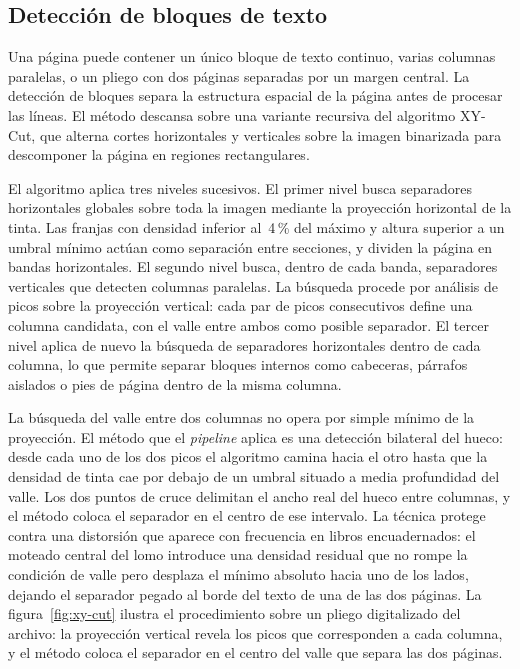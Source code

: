 \subsection{Detección de bloques de texto}

Una página puede contener un único bloque de texto continuo, varias columnas paralelas, o un pliego con dos páginas separadas por un margen central. La detección de bloques separa la estructura espacial de la página antes de procesar las líneas. El método descansa sobre una variante recursiva del algoritmo XY-Cut, que alterna cortes horizontales y verticales sobre la imagen binarizada para descomponer la página en regiones rectangulares.

El algoritmo aplica tres niveles sucesivos. El primer nivel busca separadores horizontales globales sobre toda la imagen mediante la proyección horizontal de la tinta. Las franjas con densidad inferior al~4\,\% del máximo y altura superior a un umbral mínimo actúan como separación entre secciones, y dividen la página en bandas horizontales. El segundo nivel busca, dentro de cada banda, separadores verticales que detecten columnas paralelas. La búsqueda procede por análisis de picos sobre la proyección vertical: cada par de picos consecutivos define una columna candidata, con el valle entre ambos como posible separador. El tercer nivel aplica de nuevo la búsqueda de separadores horizontales dentro de cada columna, lo que permite separar bloques internos como cabeceras, párrafos aislados o pies de página dentro de la misma columna.

La búsqueda del valle entre dos columnas no opera por simple mínimo de la proyección. El método que el \textit{pipeline} aplica es una detección bilateral del hueco: desde cada uno de los dos picos el algoritmo camina hacia el otro hasta que la densidad de tinta cae por debajo de un umbral situado a media profundidad del valle. Los dos puntos de cruce delimitan el ancho real del hueco entre columnas, y el método coloca el separador en el centro de ese intervalo. La técnica protege contra una distorsión que aparece con frecuencia en libros encuadernados: el moteado central del lomo introduce una densidad residual que no rompe la condición de valle pero desplaza el mínimo absoluto hacia uno de los lados, dejando el separador pegado al borde del texto de una de las dos páginas. La figura~\ref{fig:xy-cut} ilustra el procedimiento sobre un pliego digitalizado del archivo: la proyección vertical revela los picos que corresponden a cada columna, y el método coloca el separador en el centro del valle que separa las dos páginas.

